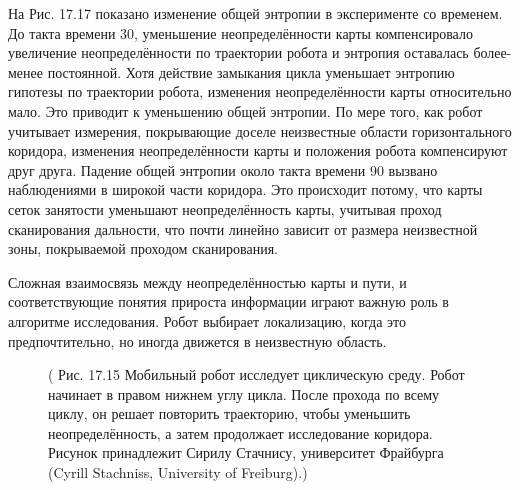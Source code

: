 \documentclass[10pt,a4paper]{article}
\begin{document}
На Рис. 17.17 показано изменение общей энтропии в эксперименте со временем. До такта времени 30, уменьшение неопределённости карты компенсировало увеличение неопределённости по траектории робота и энтропия оставалась более-менее постоянной. Хотя действие замыкания цикла уменьшает энтропию гипотезы по траектории робота, изменения неопределённости карты относительно мало. Это приводит к уменьшению общей энтропии. По мере того, как робот учитывает измерения, покрывающие доселе неизвестные области горизонтального коридора, изменения неопределённости карты и положения робота компенсируют друг друга. Падение общей энтропии около такта времени 90 вызвано наблюдениями в широкой части коридора. Это происходит потому, что карты сеток занятости уменьшают неопределённость карты, учитывая проход сканирования дальности, что почти линейно зависит от размера неизвестной зоны, покрываемой проходом сканирования.

Сложная взаимосвязь между неопределённостью карты и пути, и соответствующие понятия прироста информации играют важную роль в алгоритме исследования. Робот выбирает локализацию, когда это предпочтительно, но иногда движется в неизвестную область. 

\begin{figure}[H]
	\caption{ ( Рис. 17.15 Мобильный робот исследует циклическую среду. Робот начинает в правом нижнем углу цикла. После прохода по всему циклу, он решает повторить траекторию, чтобы уменьшить неопределённость, а затем продолжает исследование коридора. Рисунок принадлежит Сирилу Стачнису, университет Фрайбурга (Cyrill Stachniss, University of Freiburg).) }
	\label{fig:1715orig}
\end{figure}
\end{document}
